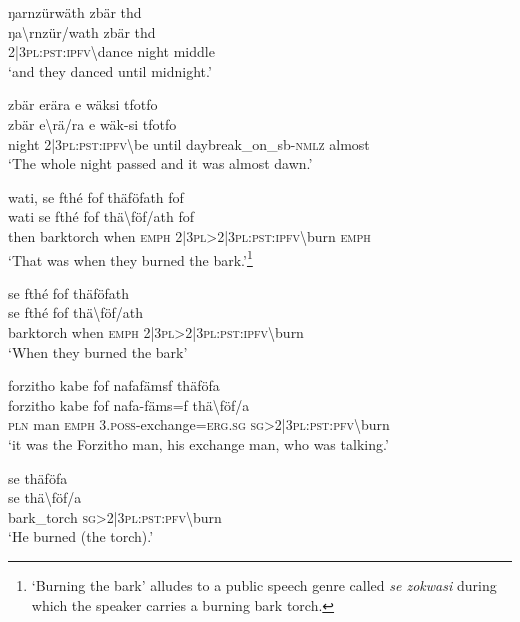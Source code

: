 \ea\label{ex:11:a2500}
ŋarnzürwäth zbär thd\\
\gll ŋa{\textbackslash}rnzür/wath	zbär	thd\\
     2|3\textsc{pl}:\textsc{pst}:\textsc{ipfv}{\textbackslash}dance	night	middle\\
\glt `and they danced until midnight.'
\z

\ea\label{ex:11:a2501}
zbär erära e wäksi tfotfo\\
\gll zbär	e{\textbackslash}rä/ra	e	wäk-si	tfotfo\\
     night	2|3\textsc{pl}:\textsc{pst}:\textsc{ipfv}{\textbackslash}be	until	daybreak\_on\_sb-\textsc{nmlz}	almost\\
\glt `The whole night passed and it was almost dawn.'
\z

\ea\label{ex:11:a2503}
wati, se fthé fof thäföfath fof\\
\gll wati	se	fthé	fof	thä{\textbackslash}föf/ath	fof\\
     then	barktorch	when	\textsc{emph}	2|3\textsc{pl}>2|3\textsc{pl}:\textsc{pst}:\textsc{ipfv}{\textbackslash}burn	\textsc{emph}\\
\glt `That was when they burned the bark.'\footnote{`Burning the bark' alludes to a public speech genre called \textit{se zokwasi} during which the speaker carries a burning bark torch.}
\z

\ea\label{ex:11:a2504}
se fthé fof thäföfath\\
\gll se	fthé	fof	thä{\textbackslash}föf/ath\\
     barktorch	when	\textsc{emph}	2|3\textsc{pl}>2|3\textsc{pl}:\textsc{pst}:\textsc{ipfv}{\textbackslash}burn\\
\glt `When they burned the bark'
\z

\ea\label{ex:11:a2505}
forzitho kabe fof nafafämsf thäföfa\\
\gll forzitho	kabe	fof	nafa-fäms=f	thä{\textbackslash}föf/a\\
     \textsc{pln}	man	\textsc{emph}	3.\textsc{poss}-exchange=\textsc{erg}.\textsc{sg}	\textsc{sg}>2|3\textsc{pl}:\textsc{pst}:\textsc{pfv}{\textbackslash}burn\\
\glt `it was the Forzitho man, his exchange man, who was talking.'
\z

\ea\label{ex:11:a2506}
se thäföfa\\
\gll se	thä{\textbackslash}föf/a\\
     bark\_torch	\textsc{sg}>2|3\textsc{pl}:\textsc{pst}:\textsc{pfv}{\textbackslash}burn\\
\glt `He burned (the torch).'
\z

